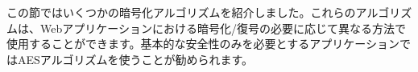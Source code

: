 この節ではいくつかの暗号化アルゴリズムを紹介しました。これらのアルゴリズムは、Webアプリケーションにおける暗号化/復号の必要に応じて異なる方法で使用することができます。基本的な安全性のみを必要とするアプリケーションではAESアルゴリズムを使うことが勧められます。

